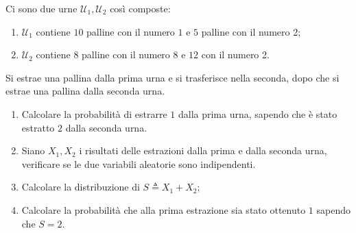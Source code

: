 \documentclass[a4paper]{article}
\begin{document}
\begin{snippetexercise}{}
    Ci sono due urne \(\mathcal U_1, \mathcal U_2\) così composte:
    \begin{enumerate}
        \item \(\mathcal U_1\) contiene \(10\) palline con il numero \(1\)
            e \(5\) palline con il numero 2;
        \item \(\mathcal U_2\) contiene \(8\) palline con il numero \(8\)
            e \(12\) con il numero 2.
    \end{enumerate}
    Si estrae una pallina dalla prima urna e si trasferisce nella seconda, dopo che si estrae una pallina dalla seconda urna.
    \begin{enumerate}
        \item Calcolare la probabilità di estrarre \(1\)
            dalla prima urna, sapendo che è stato estratto \(2\) dalla seconda urna.
        \item Siano \(X_1, X_2\) i risultati delle estrazioni dalla prima e dalla seconda urna,
            verificare se le due variabili aleatorie sono indipendenti.
        \item Calcolare la distribuzione di \(S \triangleq X_1 + X_2\);
        \item Calcolare la probabilità che alla prima estrazione sia stato ottenuto \(1\)
            sapendo che \(S= 2\).
    \end{enumerate}
\end{snippetexercise}
\end{document}
